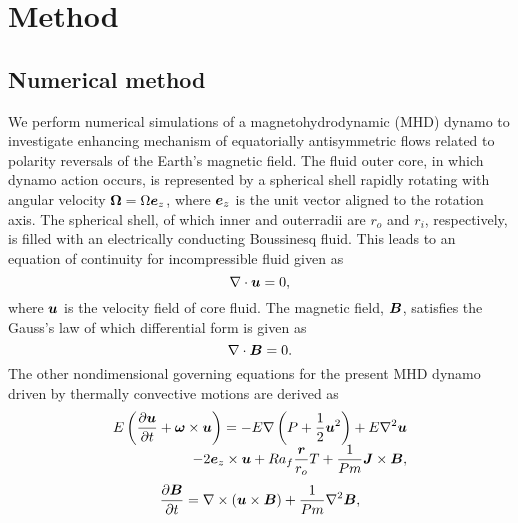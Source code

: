 \section{Method}

\subsection{Numerical method}

We perform numerical simulations of a magnetohydrodynamic (MHD) dynamo to investigate enhancing mechanism of equatorially antisymmetric flows related to polarity reversals of the Earth's magnetic field.
The fluid outer core, in which dynamo action occurs, is represented by a spherical shell rapidly rotating with angular velocity ${\bf \Omega} = \Omega \mbox{\boldmath$e$}_z$, where $\mbox{\boldmath$e$}_z$ is the unit vector aligned to the rotation axis.
The spherical shell, of which inner and outerradii are $r_o$ and $r_i$, respectively, is filled with an electrically conducting Boussinesq fluid. This leads to an equation of continuity for incompressible fluid given as
%
\begin{equation}
\nabla \cdot \mbox{\boldmath$u$} = 0,
\label{eq:divu=0}
\end{equation}
%
where $\mbox{\boldmath$u$}$ is the velocity field of core fluid.
The magnetic field, $\mbox{\boldmath$B$}$, satisfies the Gauss's law of which differential form is given as
%
\begin{equation}
\nabla \cdot \mbox{\boldmath$B$} = 0.
\label{eq:divB=0}
\end{equation}
%
The other nondimensional governing equations for the present MHD dynamo driven by thermally convective motions are derived as
%
\begin{equation}
\begin{array}{l}
\displaystyle
E \left( \frac{\partial\bvec{u}}{\partial t} +
 \bvec{\omega} \times \bvec{u} \right) =
 - E \nabla \left( P + \frac{1}{2} \bvec{u}^2 \right)
 + E \nabla^2 \bvec{u}
\nonumber \\
\displaystyle
\hspace*{\fill}
 -2 \bvec{e}_z \times \bvec{u}
 + Ra_f \frac{\bvec{r}}{r_o} T
 + \frac{1}{Pm} \bvec{J} \times \bvec{B} ,
\label{eq:momentum}
\end{array}
\end{equation}
%
\begin{equation}
\frac{\partial \mbox{\boldmath$B$}}{\partial t} =
 \nabla \times (\mbox{\boldmath$u$} \times \mbox{\boldmath$B$} )
 + \frac{1}{Pm} \nabla^2 \mbox{\boldmath$B$} ,
\label{eq:induction}
\end{equation}
